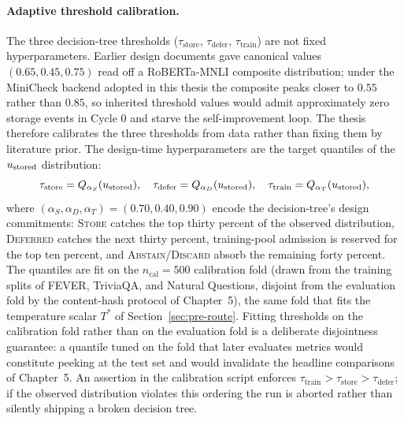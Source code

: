 \paragraph{Adaptive threshold calibration.}
The three decision-tree thresholds ($\tau_{\text{store}}$, $\tau_{\text{defer}}$, $\tau_{\text{train}}$) are not fixed hyperparameters. Earlier design documents gave canonical values $(0.65, 0.45, 0.75)$ read off a RoBERTa-MNLI composite distribution; under the MiniCheck backend adopted in this thesis the composite peaks closer to $0.55$ rather than $0.85$, so inherited threshold values would admit approximately zero storage events in Cycle 0 and starve the self-improvement loop. The thesis therefore calibrates the three thresholds from data rather than fixing them by literature prior. The design-time hyperparameters are the target quantiles of the $u_{\text{stored}}$ distribution:
\begin{equation}
\tau_{\text{store}} = Q_{\alpha_S}(u_{\text{stored}}), \quad
\tau_{\text{defer}} = Q_{\alpha_D}(u_{\text{stored}}), \quad
\tau_{\text{train}} = Q_{\alpha_T}(u_{\text{stored}}),
\label{eq:threshold-calibration}
\end{equation}
where $(\alpha_S, \alpha_D, \alpha_T) = (0.70, 0.40, 0.90)$ encode the decision-tree's design commitments: \textsc{Store} catches the top thirty percent of the observed distribution, \textsc{Deferred} catches the next thirty percent, training-pool admission is reserved for the top ten percent, and \textsc{Abstain}/\textsc{Discard} absorb the remaining forty percent. The quantiles are fit on the $n_{\text{cal}} = 500$ calibration fold (drawn from the training splits of FEVER, TriviaQA, and Natural Questions, disjoint from the evaluation fold by the content-hash protocol of Chapter~5), the same fold that fits the temperature scalar $T^{*}$ of Section~\ref{sec:pre-route}. Fitting thresholds on the calibration fold rather than on the evaluation fold is a deliberate disjointness guarantee: a quantile tuned on the fold that later evaluates metrics would constitute peeking at the test set and would invalidate the headline comparisons of Chapter~5. An assertion in the calibration script enforces $\tau_{\text{train}} > \tau_{\text{store}} > \tau_{\text{defer}}$; if the observed distribution violates this ordering the run is aborted rather than silently shipping a broken decision tree.

